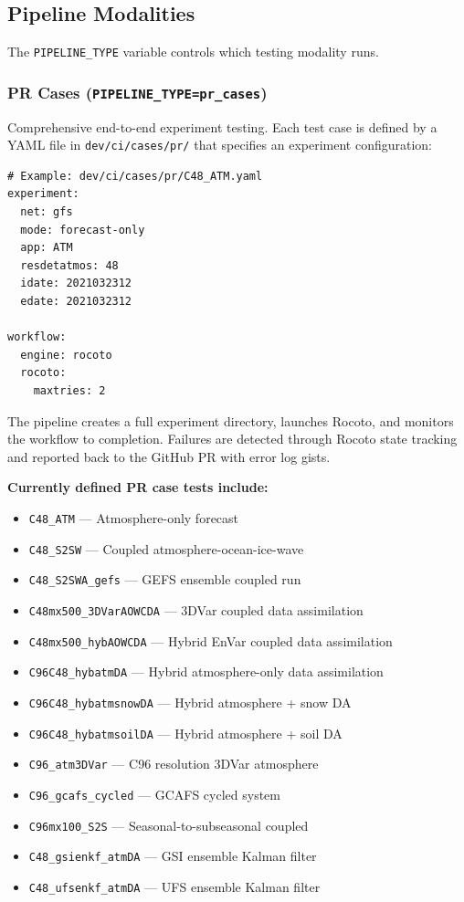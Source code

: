 \documentclass[11pt,letterpaper,twoside]{article}
\begin{document}
\subsection{Pipeline Modalities}
\label{sec:modalities}

The \texttt{PIPELINE\_TYPE} variable controls which testing modality runs.

\subsubsection{PR Cases (\texttt{PIPELINE\_TYPE=pr\_cases})}
\label{sec:pr-cases}

Comprehensive end-to-end experiment testing. Each test case is defined by a YAML
file in \texttt{dev/ci/cases/pr/} that specifies an experiment configuration:

\begin{lstlisting}[style=yaml, caption={Example PR case definition (\texttt{dev/ci/cases/pr/C48\_ATM.yaml})}, label=lst:case-yaml]
# Example: dev/ci/cases/pr/C48_ATM.yaml
experiment:
  net: gfs
  mode: forecast-only
  app: ATM
  resdetatmos: 48
  idate: 2021032312
  edate: 2021032312

workflow:
  engine: rocoto
  rocoto:
    maxtries: 2
\end{lstlisting}

The pipeline creates a full experiment directory, launches Rocoto, and monitors
the workflow to completion. Failures are detected through Rocoto state tracking
and reported back to the GitHub PR with error log gists.

\textbf{Currently defined PR case tests include:}

\begin{itemize}[leftmargin=1.5em, itemsep=1pt]
  \item \texttt{C48\_ATM} --- Atmosphere-only forecast
  \item \texttt{C48\_S2SW} --- Coupled atmosphere-ocean-ice-wave
  \item \texttt{C48\_S2SWA\_gefs} --- GEFS ensemble coupled run
  \item \texttt{C48mx500\_3DVarAOWCDA} --- 3DVar coupled data assimilation
  \item \texttt{C48mx500\_hybAOWCDA} --- Hybrid EnVar coupled data assimilation
  \item \texttt{C96C48\_hybatmDA} --- Hybrid atmosphere-only data assimilation
  \item \texttt{C96C48\_hybatmsnowDA} --- Hybrid atmosphere + snow DA
  \item \texttt{C96C48\_hybatmsoilDA} --- Hybrid atmosphere + soil DA
  \item \texttt{C96\_atm3DVar} --- C96 resolution 3DVar atmosphere
  \item \texttt{C96\_gcafs\_cycled} --- GCAFS cycled system
  \item \texttt{C96mx100\_S2S} --- Seasonal-to-subseasonal coupled
  \item \texttt{C48\_gsienkf\_atmDA} --- GSI ensemble Kalman filter
  \item \texttt{C48\_ufsenkf\_atmDA} --- UFS ensemble Kalman filter
\end{itemize}
\end{document}
